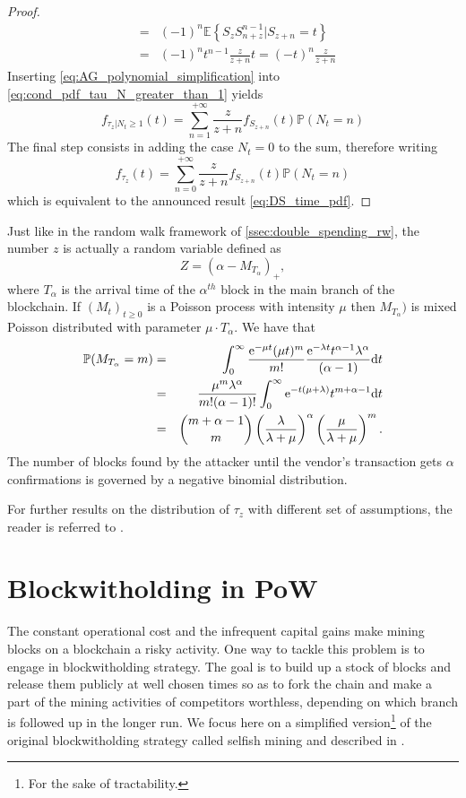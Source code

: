 \begin{proof}
\begin{eqnarray}
&=& (-1)^n\mathbb{E}\left\{S_z S_{n+z}^{n-1} \rvert S_{z+n}=t\right\} \nonumber\\
&=& (-1)^nt^{n-1}\frac{z}{z+n}t =(-t)^n\frac{z}{z+n} \label{eq:AG_polynomial_simplification}
\end{eqnarray}
Inserting \eqref{eq:AG_polynomial_simplification} into \eqref{eq:cond_pdf_tau_N_greater_than_1} yields
\begin{equation*}
f_{\tau_z|N_t\geq1}(t)=\sum_{n=1}^{+\infty}\frac{z}{z+n}f_{S_{z+n}}(t)\mathbb{P}(N_t=n)
\end{equation*}
The final step consists in adding the case $N_t=0$ to the sum, therefore writing
\begin{equation*}
f_{\tau_z}(t)=\sum_{n=0}^{+\infty}\frac{z}{z+n}f_{S_{z+n}}(t)\mathbb{P}(N_t=n)
\end{equation*}
which is equivalent to the announced result \eqref{eq:DS_time_pdf}.  
\end{proof}
\begin{remark}
Just like in the random walk framework of \cref{ssec:double_spending_rw}, the number $z$ is actually a random variable defined as 
$$
Z = (\alpha - M_{T_\alpha})_+,
$$
where $T_\alpha$ is the arrival time of the $\alpha^{th}$ block in the main branch of the blockchain. If $(M_t)_{t\geq0}$ is a Poisson process with intensity $\mu$ then $M_{T_\alpha})$ is mixed Poisson distributed with parameter $\mu\cdot T_{\alpha}$. We have that 
\begin{eqnarray*}
\mathbb{P}(M_{T_\alpha} = m) &=& \int_{0}^{\infty}\frac{\mathrm{e}^{-\mu t}(\mu t)^m}{m!}\frac{\mathrm{e}^{-\lambda t}t^{\alpha-1}\lambda ^\alpha}{(\alpha -1)}\text{d}t\\
&=&\frac{\mu^m\lambda^{\alpha}}{m!(\alpha-1)!}\int_{0}^{\infty}\mathrm{e}^{-t(\mu + \lambda)}t^{m+\alpha-1}\text{d}t\\
&=&\binom{m+\alpha-1}{m}\left(\frac{\lambda}{\lambda+\mu}\right)^{\alpha}\left(\frac{\mu}{\lambda+\mu}\right)^{m}.
\end{eqnarray*}
The number of blocks found by the attacker until the vendor's transaction gets $\alpha$ confirmations is governed by a negative binomial distribution.
\end{remark}
\noindent For further results on the distribution of $\tau_z$ with different set of assumptions, the reader is referred to \citet{Goffard2019}.

\section{Blockwitholding in PoW}\label{sec:blockwithholding}
The constant operational cost and the infrequent capital gains make mining blocks on a \PoW blockchain a risky activity. One way to tackle this problem is to engage in blockwitholding strategy. The goal is to build up a stock of blocks and release them publicly at well chosen times so as to fork the chain and make a part of the mining activities of competitors worthless, depending on which branch is followed up in the longer run. We focus here on a simplified version\footnote{For the sake of tractability.} of the original blockwitholding strategy called selfish mining and described in \citet{Eyal2014}. \\


